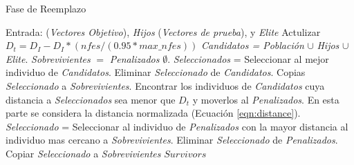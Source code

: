 \begin{algorithm}[t]
  \scriptsize
	\caption{Fase de Reemplazo} \label{alg:Replacement}
	\begin{algorithmic}[1]
	\STATE Entrada:  (\textit{Vectores Objetivo}), \textit{Hijos} (\textit{Vectores de prueba}), y \textit{Elite}
	\STATE Actulizar $D_t = D_I - D_I *(nfes/(0.95*max\_nfes)) $ 
	\STATE \textit{Candidatos = Población} $\cup$ \textit{Hijos} $\cup$ \textit{Elite}.
	\STATE \textit{Sobrevivientes} $=$ \textit{Penalizados} $\emptyset$.
	   \STATE \textit{Seleccionados} = Seleccionar al mejor individuo de \textit{Candidatos}.
		 \STATE Eliminar \textit{Seleccionado} de \textit{Candidatos}.
	   \STATE Copias \textit{Seleccionado} a \textit{Sobrevivientes}.
	   \STATE Encontrar los individuos de \textit{Candidatos} cuya distancia a \textit{Seleccionados} sea menor que $D_t$ y moverlos al \textit{Penalizados}. En esta parte se considera la distancia normalizada (Ecuación \ref{eqn:distance}).
	\ENDWHILE
	   \STATE \textit{Seleccionado} = Seleccionar al individuo de \textit{Penalizados} con la mayor distancia al individuo mas cercano a \textit{Sobrevivientes}.
		 \STATE Eliminar \textit{Seleccionado} de \textit{Penalizados}.
	   \STATE Copiar \textit{Seleccionado} a \textit{Sobrevivientes}
	\ENDWHILE
  \RETURN $Survivors$
\end{algorithmic}
\end{algorithm}


